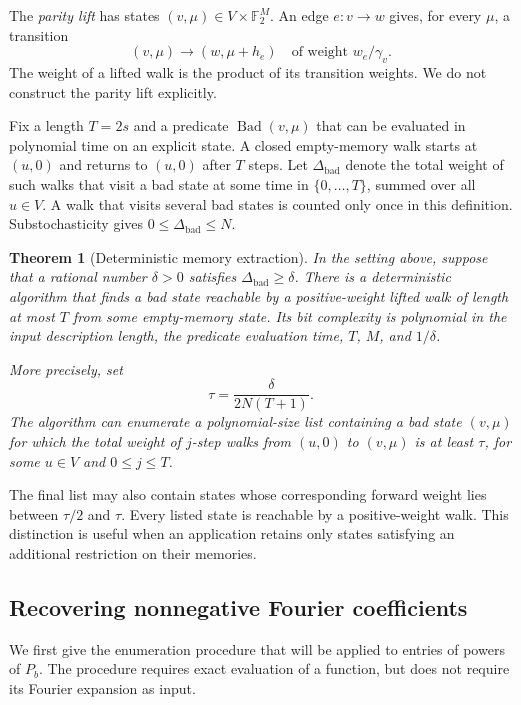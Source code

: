 \documentclass[letterpaper,11pt]{article}
\newtheorem{theorem}{Theorem}
\theoremstyle{definition}
\newcommand{\F}{\mathbb F}
\begin{document}
The \emph{parity lift} has states $(v,\mu)\in V\times\F_2^M$.
An edge $e:v\to w$ gives, for every $\mu$, a transition
\[
  (v,\mu)\longrightarrow(w,\mu+h_e)
  \quad\text{of weight }w_e/\gamma_v.
\]
The weight of a lifted walk is the product of its transition weights.
We do not construct the parity lift explicitly.

Fix a length $T=2s$ and a predicate $\operatorname{Bad}(v,\mu)$ that can
be evaluated in polynomial time on an explicit state.  A closed
empty-memory walk starts at $(u,0)$ and returns to $(u,0)$ after $T$ steps.
Let $\Delta_{\mathrm{bad}}$ denote the total weight of such walks that
visit a bad state at some time in $\{0,\ldots,T\}$, summed over all
$u\in V$.  A walk that visits several bad states is counted only once
in this definition.  Substochasticity gives
$0\leq\Delta_{\mathrm{bad}}\leq N$.

\begin{theorem}[Deterministic memory extraction]
\label{thm:extraction}
In the setting above, suppose that a rational number $\delta>0$ satisfies
$\Delta_{\mathrm{bad}}\geq\delta$.  There is a deterministic algorithm
that finds a bad state reachable by a positive-weight lifted walk of
length at most $T$ from some empty-memory state.  Its bit complexity is
polynomial in the input description length, the predicate evaluation
time, $T$, $M$, and $1/\delta$.

More precisely, set
\begin{equation}
  \tau=\frac{\delta}{2N(T+1)}.
  \label{ex:threshold}
\end{equation}
The algorithm can enumerate a polynomial-size list containing a bad
state $(v,\mu)$ for which the total weight of $j$-step walks from
$(u,0)$ to $(v,\mu)$ is at least $\tau$, for some $u\in V$ and
$0\leq j\leq T$.
\end{theorem}

The final list may also contain states whose corresponding forward weight
lies between $\tau/2$ and $\tau$.  Every listed state is reachable by a
positive-weight walk.  This distinction is useful when an application
retains only states satisfying an additional restriction on their memories.

\subsection{Recovering nonnegative Fourier coefficients}

We first give the enumeration procedure that will be applied to entries
of powers of $P_b$.  The procedure requires exact evaluation of a function,
but does not require its Fourier expansion as input.
\end{document}
